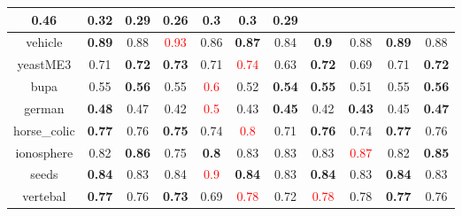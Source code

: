 \documentclass{article}%
\begin{document}
\begin{tabular}{c|cccccccccc}
{0.46
}&\textbf{0.32}&0.29&0.26&\textbf{0.3}&\textbf{0.3}&0.29\\%
\hline%
vehicle&\textbf{0.89}&0.88&\textcolor{red}{ 
0.93
}&0.86&\textbf{0.87}&0.84&\textbf{0.9}&0.88&\textbf{0.89}&0.88\\%
\hline%
yeastME3&0.71&\textbf{0.72}&\textbf{0.73}&0.71&\textcolor{red}{ 
0.74
}&0.63&\textbf{0.72}&0.69&0.71&\textbf{0.72}\\%
\hline%
bupa&0.55&\textbf{0.56}&0.55&\textcolor{red}{ 
0.6
}&0.52&\textbf{0.54}&\textbf{0.55}&0.51&0.55&\textbf{0.56}\\%
\hline%
german&\textbf{0.48}&0.47&0.42&\textcolor{red}{ 
0.5
}&0.43&\textbf{0.45}&0.42&\textbf{0.43}&0.45&\textbf{0.47}\\%
\hline%
horse\_colic&\textbf{0.77}&0.76&\textbf{0.75}&0.74&\textcolor{red}{ 
0.8
}&0.71&\textbf{0.76}&0.74&\textbf{0.77}&0.76\\%
\hline%
ionosphere&0.82&\textbf{0.86}&0.75&\textbf{0.8}&0.83&0.83&0.83&\textcolor{red}{ 
0.87
}&0.82&\textbf{0.85}\\%
\hline%
seeds&\textbf{0.84}&0.83&0.84&\textcolor{red}{ 
0.9
}&\textbf{0.84}&0.83&\textbf{0.84}&0.83&\textbf{0.84}&0.83\\%
\hline%
vertebal&\textbf{0.77}&0.76&\textbf{0.73}&0.69&\textcolor{red}{ 
0.78
}&0.72&\textcolor{red}{ 
0.78
}&0.78&\textbf{0.77}&0.76\\%
\hline%
\end{tabular}

%
\end{document}
